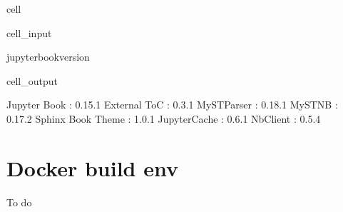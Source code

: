 \documentclass[letterpaper,table,10pt,english]{jupyterBook}
\begin{document}
\begin{sphinxuseclass}{cell}\begin{sphinxVerbatimInput}

\begin{sphinxuseclass}{cell_input}
\begin{sphinxVerbatim}[commandchars=\\\{\}]
jupyter\PYGZhy{}book\PYGZhy{}\PYGZhy{}version
\end{sphinxVerbatim}

\end{sphinxuseclass}\end{sphinxVerbatimInput}
\begin{sphinxVerbatimOutput}

\begin{sphinxuseclass}{cell_output}
\begin{sphinxVerbatim}[commandchars=\\\{\}]
Jupyter Book      : 0.15.1
External ToC      : 0.3.1
MyST\PYGZhy{}Parser       : 0.18.1
MyST\PYGZhy{}NB           : 0.17.2
Sphinx Book Theme : 1.0.1
Jupyter\PYGZhy{}Cache     : 0.6.1
NbClient          : 0.5.4
\end{sphinxVerbatim}

\end{sphinxuseclass}\end{sphinxVerbatimOutput}

\end{sphinxuseclass}

\section{Docker build env}
\label{\detokenize{tests/build_versions_checks:docker-build-env}}
\sphinxAtStartPar
To do
\end{document}
